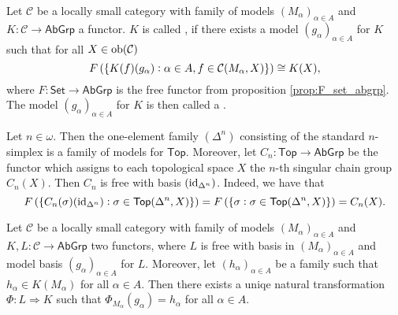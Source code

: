 \begin{definition}
	Let $\mathcal{C}$ be a locally small category with family of models $(M_\alpha)_{\alpha \in A}$ and $K : \mathcal{C} \to \mathsf{AbGrp}$ a functor. $K$ is called , if there exists a model $(g_\alpha)_{\alpha \in A}$ for $K$ such that for all $X \in \operatorname{ob}(\mathcal{C})$
	\begin{equation}
		F\del[0]{\cbr[0]{K(f)(g_\alpha) : \alpha \in A, f \in \mathcal{C}(M_\alpha,X)}} \cong K(X),
	\end{equation}
	\noindent where $F : \mathsf{Set} \to \mathsf{AbGrp}$ is the free functor from proposition \ref{prop:F_set_abgrp}. The model $(g_\alpha)_{\alpha \in A}$ for $K$ is then called a .
\end{definition}

\begin{example}
	Let $n \in \omega$. Then the one-element family $(\Delta^n)$ consisting of the standard $n$-simplex is a family of models for $\mathsf{Top}$. Moreover, let $C_n : \mathsf{Top} \to \mathsf{AbGrp}$ be the functor which assigns to each topological space $X$ the $n$-th singular chain group $C_n(X)$. Then $C_n$ is free with basis $(\operatorname{id}_{\Delta^n})$. Indeed, we have that
\begin{equation*}
	F\del[0]{\cbr[0]{C_n(\sigma)(\id_{\Delta^n}) : \sigma \in \mathsf{Top}(\Delta^n,X)}} = F\del[0]{\cbr[0]{\sigma : \sigma \in \mathsf{Top}(\Delta^n,X)}} = C_n(X).
\end{equation*}
\end{example}

\begin{proposition}
	Let $\mathcal{C}$ be a locally small category with family of models $(M_\alpha)_{\alpha \in A}$ and $K,L : \mathcal{C} \to \mathsf{AbGrp}$ two functors, where $L$ is free with basis in $(M_\alpha)_{\alpha \in A}$ and model basis $(g_\alpha)_{\alpha \in A}$ for $L$. Moreover, let $(h_\alpha)_{\alpha \in A}$ be a family such that $h_\alpha \in K(M_\alpha)$ for all $\alpha \in A$. Then there exists a uniqe natural transformation $\Phi : L \Rightarrow K$ such that $\Phi_{M_\alpha}(g_\alpha) = h_\alpha$ for all $\alpha \in A$.
\end{proposition}

